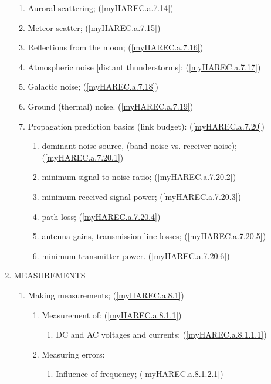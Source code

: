 \begin{enumerate}
\begin{enumerate}[noitemsep]
\item Auroral scattering; (\ref{myHAREC.a.7.14})\label{HAREC.a.7.14}
\item Meteor scatter; (\ref{myHAREC.a.7.15})\label{HAREC.a.7.15}
\item Reflections from the moon; (\ref{myHAREC.a.7.16})\label{HAREC.a.7.16}
\item Atmospheric noise [distant thunderstorms]; (\ref{myHAREC.a.7.17})\label{HAREC.a.7.17}
\item Galactic noise; (\ref{myHAREC.a.7.18})\label{HAREC.a.7.18}
\item Ground (thermal) noise. (\ref{myHAREC.a.7.19})\label{HAREC.a.7.19}
\item Propagation prediction basics (link budget): (\ref{myHAREC.a.7.20})\label{HAREC.a.7.20}
\begin{enumerate}[noitemsep]
\item dominant noise source, (band noise vs. receiver noise); (\ref{myHAREC.a.7.20.1})\label{HAREC.a.7.20.1}
\item minimum signal to noise ratio; (\ref{myHAREC.a.7.20.2})\label{HAREC.a.7.20.2}
\item minimum received signal power; (\ref{myHAREC.a.7.20.3})\label{HAREC.a.7.20.3}
\item path loss; (\ref{myHAREC.a.7.20.4})\label{HAREC.a.7.20.4}
\item antenna gains, transmission line losses; (\ref{myHAREC.a.7.20.5})\label{HAREC.a.7.20.5}
\item minimum transmitter power. (\ref{myHAREC.a.7.20.6})\label{HAREC.a.7.20.6}
\end{enumerate}
\end{enumerate}
\item MEASUREMENTS
\begin{enumerate}[noitemsep]
\item Making measurements; (\ref{myHAREC.a.8.1})\label{HAREC.a.8.1}
\begin{enumerate}[noitemsep]
\item Measurement of: (\ref{myHAREC.a.8.1.1})\label{HAREC.a.8.1.1}
\begin{enumerate}[noitemsep]
\item DC and AC voltages and currents; (\ref{myHAREC.a.8.1.1.1})\label{HAREC.a.8.1.1.1}
\end{enumerate}
\item Measuring errors:
\begin{enumerate}[noitemsep]
\item Influence of frequency; (\ref{myHAREC.a.8.1.2.1})\label{HAREC.a.8.1.2.1}

\end{enumerate}
\end{enumerate}
\end{enumerate}
\end{enumerate}
